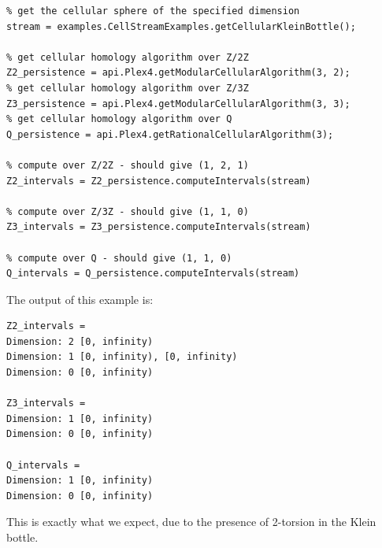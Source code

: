 \documentclass[10pt]{article}
\begin{document}
\begin{verbatim}
% get the cellular sphere of the specified dimension
stream = examples.CellStreamExamples.getCellularKleinBottle();

% get cellular homology algorithm over Z/2Z
Z2_persistence = api.Plex4.getModularCellularAlgorithm(3, 2);
% get cellular homology algorithm over Z/3Z
Z3_persistence = api.Plex4.getModularCellularAlgorithm(3, 3);
% get cellular homology algorithm over Q
Q_persistence = api.Plex4.getRationalCellularAlgorithm(3);

% compute over Z/2Z - should give (1, 2, 1)
Z2_intervals = Z2_persistence.computeIntervals(stream)

% compute over Z/3Z - should give (1, 1, 0)
Z3_intervals = Z3_persistence.computeIntervals(stream)

% compute over Q - should give (1, 1, 0)
Q_intervals = Q_persistence.computeIntervals(stream)
\end{verbatim}
The output of this example is:
\begin{verbatim}
Z2_intervals =
Dimension: 2 [0, infinity)
Dimension: 1 [0, infinity), [0, infinity)
Dimension: 0 [0, infinity)
  
Z3_intervals =
Dimension: 1 [0, infinity)
Dimension: 0 [0, infinity)
 
Q_intervals =
Dimension: 1 [0, infinity)
Dimension: 0 [0, infinity)
\end{verbatim}
This is exactly what we expect, due to the presence of 2-torsion in the Klein bottle.




\end{document}
